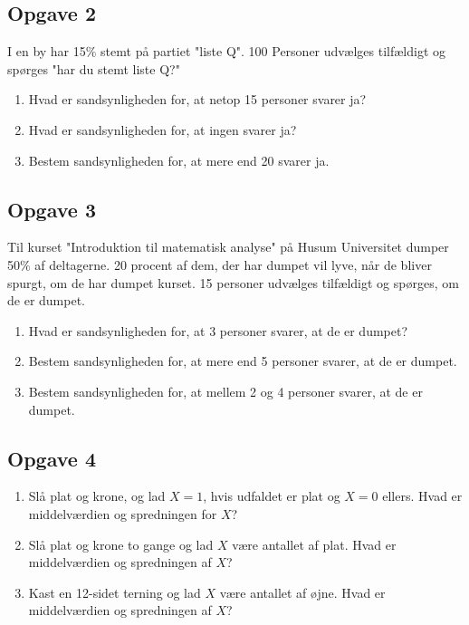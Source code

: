 \subsection*{Opgave 2}
I en by har 15$\%$ stemt på partiet "liste Q". 100 Personer udvælges tilfældigt og spørges "har du stemt liste Q?"
\begin{enumerate}[label=\roman*)]
	\item Hvad er sandsynligheden for, at netop 15 personer svarer ja?
	\item Hvad er sandsynligheden for, at ingen svarer ja?
	\item Bestem sandsynligheden for, at mere end 20 svarer ja. 
\end{enumerate}

\subsection*{Opgave 3}
Til kurset "Introduktion til matematisk analyse" på Husum Universitet dumper 50$\%$ af deltagerne. 20 procent af dem, der har dumpet vil lyve, når de bliver spurgt, om de har dumpet kurset. 15 personer udvælges tilfældigt og spørges, om de er dumpet. 
\begin{enumerate}[label=\roman*)]
	\item Hvad er sandsynligheden for, at 3 personer svarer, at de er dumpet?
	\item Bestem sandsynligheden for, at mere end 5 personer svarer, at de er dumpet.
	\item Bestem sandsynligheden for, at mellem 2 og 4 personer svarer, at de er dumpet. 
\end{enumerate}



\subsection*{Opgave 4}
\begin{enumerate}[label=\roman*)]
\item Slå plat og krone, og lad $X=1$, hvis udfaldet er plat og $X=0$ ellers. Hvad er middelværdien og spredningen for $X$?
\item Slå plat og krone to gange og lad $X$ være antallet af plat. Hvad er middelværdien og spredningen af $X$?
\item Kast en 12-sidet terning og lad $X$ være antallet af øjne. Hvad er middelværdien og spredningen af $X$?

\end{enumerate}

